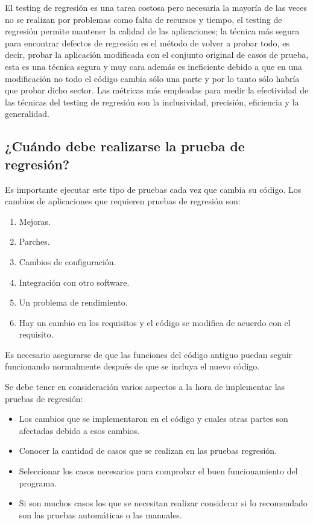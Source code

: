 \documentclass[conference]{IEEEtran}
\begin{document}
El testing de regresión es una tarea costosa pero necesaria la mayoría de las veces no se realizan por problemas como falta de recursos y tiempo, el testing de regresión permite mantener la calidad de las aplicaciones; la técnica más segura para encontrar defectos de regresión es el método de volver a probar todo, es decir, probar la aplicación modificada con el conjunto original de casos de prueba, esta es una técnica segura y muy cara además es ineficiente debido a que en una modificación no todo el código cambia sólo una parte y por lo tanto sólo habría que probar dicho sector. Las métricas más empleadas para medir la efectividad de las técnicas del testing de regresión son la inclusividad, precisión, eficiencia y  la generalidad. 




\subsection{¿Cuándo debe realizarse la prueba de regresión?}

Es importante ejecutar este tipo de pruebas cada vez que cambia su código. Los cambios de aplicaciones que requieren pruebas de regresión son:

\begin{enumerate}[1.]
\item Mejoras.
\item Parches.
\item Cambios de configuración.
\item Integración con otro software.
\item Un problema de rendimiento.
\item Hay un cambio en los requisitos y el código se modifica de acuerdo con el requisito.
\end{enumerate}

Es necesario asegurarse de que las funciones del código antiguo puedan seguir funcionando normalmente después de que se incluya el nuevo código.

Se debe tener en consideración varios aspectos a la hora de implementar las pruebas de regresión:

\begin{itemize}
\item Los cambios que se implementaron en el código y cuales otras partes son afectadas debido a esos cambios.
\item Conocer la cantidad de casos que se realizan en las pruebas regresión.
\item Seleccionar los casos necesarios para comprobar el buen funcionamiento del programa.
\item Si son muchos casos los que se necesitan realizar considerar si lo recomendado son las pruebas automáticas o las manuales.
\end{itemize}
\end{document}
